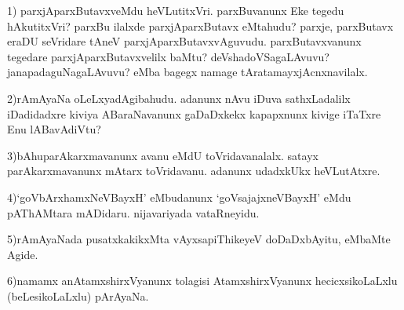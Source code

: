 1) parxjAparxButavxveMdu heVLutitxVri. parxBuvanunx Eke tegedu hAkutitxVri? parxBu ilalxde parxjAparxButavx eMtahudu? parxje, parxButavx eraDU seVridare tAneV parxjAparxButavxvAguvudu. parxButavxvanunx tegedare parxjAparxButavxvelilx baMtu? deVshadoVSagaLAvuvu? janapadaguNagaLAvuvu? eMba bagegx namage tAratamayxjAcnxnavilalx. 

2)rAmAyaNa oLeLxyadAgibahudu. adanunx nAvu iDuva sathxLadalilx iDadidadxre kiviya ABaraNavanunx gaDaDxkekx kapapxnunx kivige iTaTxre Enu lABavAdiVtu?  

3)bAhuparAkarxmavanunx avanu eMdU toVridavanalalx. satayx parAkarxmavanunx mAtarx toVridavanu. adanunx udadxkUkx heVLutAtxre.

4)`goVbArxhamxNeVBayxH' eMbudanunx `goVsajajxneVBayxH' eMdu pAThAMtara mADidaru. nijavariyada vataRneyidu.

5)rAmAyaNada pusatxkakikxMta vAyxsapiThikeyeV doDaDxbAyitu, eMbaMte Agide. 

6)namamx anAtamxshirxVyanunx tolagisi AtamxshirxVyanunx hecicxsikoLaLxlu (beLesikoLaLxlu) pArAyaNa. 
